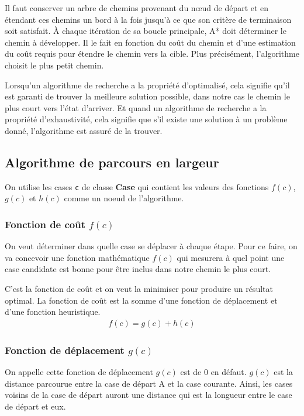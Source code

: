 \documentclass[12pt, pdflatex]{article}
\begin{document}
    Il faut conserver un arbre de chemins provenant du nœud de départ et en étendant ces chemins un bord à la fois jusqu'à ce que son critère de terminaison soit satisfait. À chaque itération de sa boucle principale, A* doit déterminer le chemin à développer. Il le fait en fonction du coût du chemin et d'une estimation du coût requis pour étendre le chemin vers la cible. Plus précisément, l'algorithme choisit le plus petit chemin.

    Lorsqu'un algorithme de recherche a la propriété d'optimalisé, cela signifie qu'il est garanti de trouver la meilleure solution possible, dans notre cas le chemin le plus court vers l'état d'arriver. Et quand un algorithme de recherche a la propriété d'exhaustivité, cela signifie que s'il existe une solution à un problème donné, l'algorithme est assuré de la trouver. 
    
    \subsection{Algorithme de parcours en largeur}

        On utilise les cases \texttt{c} de classe \textbf{Case} qui contient les valeurs des fonctions $f(c)$, $g(c)$ et $h(c)$ comme un noeud de l'algorithme. 
        
        \subsubsection{Fonction de coût \texorpdfstring{$f(c)$}{f(c)}}
        On veut déterminer dans quelle case se déplacer à chaque étape. Pour ce faire, on va concevoir une fonction mathématique $f(c)$ qui mesurera à quel point une case candidate est bonne pour être inclus dans notre chemin le plus court.

        C'est la fonction de coût et on veut la minimiser pour produire un résultat optimal. La fonction de coût est la somme d'une fonction de déplacement et d'une fonction heuristique.
        \begin{align*}
            f(c) = g(c) + h(c)
        \end{align*}

        \subsubsection{Fonction de déplacement \texorpdfstring{$g(c)$}{g(c)}}
        On appelle cette fonction de déplacement $g(c)$ est de 0 en défaut. $g(c)$ est la distance parcourue entre la case de départ A et la case courante. Ainsi, les cases voisins de la case de départ auront une distance qui est la longueur entre le case de départ et eux.
\end{document}
